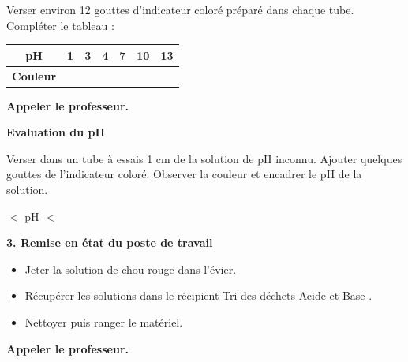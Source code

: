 \documentclass[11pt,a4paper]{article}
\begin{document}
\vspace{3mm}

Verser environ 12 gouttes d'indicateur coloré préparé dans chaque tube. Compléter le tableau :

\vspace{3mm}

\begin{center}
\begin{tabular}{|c|c|c|c|c|c|c|}
\hline
\textbf{pH} & \textbf{1} & \textbf{3} & \textbf{4} & \textbf{7} & \textbf{10} & \textbf{13} \\
\hline
\textbf{Couleur} & & & & & & \\[14pt]
\hline
\end{tabular}
\end{center}

\vspace{3mm}

\begin{tcolorbox}[colback=orange!10!white, colframe=orange!80!black]
\textbf{Appeler le professeur.}
\end{tcolorbox}

\vspace{5mm}

\textbf{Evaluation du pH}

\vspace{3mm}

Verser dans un tube à essais 1 cm de la solution de pH inconnu. Ajouter quelques gouttes de l'indicateur coloré. Observer la couleur et encadrer le pH de la solution.

\vspace{5mm}

\begin{center}
\framebox[3cm]{\rule{0pt}{8mm}} \quad $<$ \quad pH \quad $<$ \quad \framebox[3cm]{\rule{0pt}{8mm}}
\end{center}

\vspace{7mm}


\textbf{\large 3. Remise en état du poste de travail}

\vspace{3mm}

\begin{itemize}
  \item Jeter la solution de chou rouge dans l'évier.
  \item Récupérer les solutions dans le récipient \og Tri des déchets Acide et Base \fg{}.
  \item Nettoyer puis ranger le matériel.
\end{itemize}

\begin{tcolorbox}[colback=orange!10!white, colframe=orange!80!black]
\textbf{Appeler le professeur.}
\end{tcolorbox}
\end{document}
